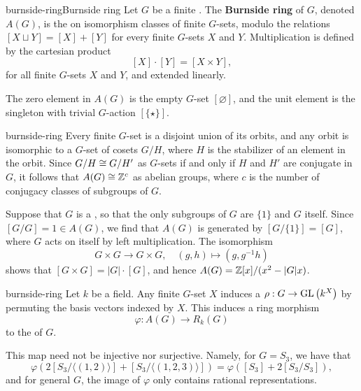 \begin{topic}{burnside-ring}{Burnside ring}
    Let $G$ be a finite . The \textbf{Burnside ring} of $G$, denoted $A(G)$, is the  on isomorphism classes of finite $G$-sets, modulo the relations $[X \sqcup Y] = [X] + [Y]$ for every finite $G$-sets $X$ and $Y$. Multiplication is defined by the cartesian product
    \[ [X] \cdot [Y] = [X \times Y] , \]
    for all finite $G$-sets $X$ and $Y$, and extended linearly.
    
    The zero element in $A(G)$ is the empty $G$-set $[\varnothing]$, and the unit element is the singleton with trivial $G$-action $[\{ \star \}]$.
\end{topic}

\begin{example}{burnside-ring}
    Every finite $G$-set is a disjoint union of its orbits, and any orbit is isomorphic to a $G$-set of cosets $G/H$, where $H$ is the stabilizer of an element in the orbit. Since $G/H \cong G/H'$ as $G$-sets if and only if $H$ and $H'$ are conjugate in $G$, it follows that $A(G) \cong \mathbb{Z}^c$ as abelian groups, where $c$ is the number of conjugacy classes of subgroups of $G$.
    
    Suppose that $G$ is a , so that the only subgroups of $G$ are $\{ 1 \}$ and $G$ itself. Since $[G/G] = 1 \in A(G)$, we find that $A(G)$ is generated by $[G / \{ 1 \}] = [G]$, where $G$ acts on itself by left multiplication. The isomorphism
    \[ G \times G \to G \times G, \quad (g, h) \mapsto (g, g^{-1} h) \]
    shows that $[G \times G] = |G| \cdot [G]$, and hence $A(G) = \mathbb{Z}[x] / (x^2 - |G| x)$.
\end{example}

\begin{example}{burnside-ring}
    Let $k$ be a field. Any finite $G$-set $X$ induces a  $\rho : G \to \textup{GL}\left(k^X\right)$ by permuting the basis vectors indexed by $X$. This induces a ring morphism
    \[ \varphi : A(G) \to R_k(G) \]
    to the  of $G$.
    
    This map need not be injective nor surjective. Namely, for $G = S_3$, we have that
    \[ \varphi(2 [S_3 / \langle (1, 2) \rangle] + [S_3 / \langle (1, 2, 3) \rangle]) = \varphi([S_3] + 2 [S_3 / S_3]) , \]
    and for general $G$, the image of $\varphi$ only contains rational representations.
\end{example}

